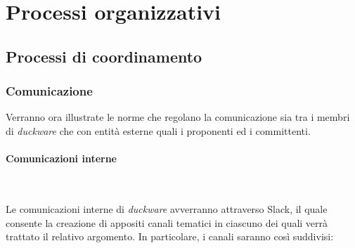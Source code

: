 \clearpage
\section{Processi organizzativi}
\label{sec:proc_org}
\subsection{Processi di coordinamento}
\label{sec:processi_coordinamento}
\subsubsection{Comunicazione}
Verranno ora illustrate le norme che regolano la comunicazione sia tra i membri di \emph{duckware} che con entità esterne quali i proponenti ed i committenti.

\paragraph{Comunicazioni interne}\mbox{}\\[0.4cm]
Le comunicazioni interne di \emph{duckware} avverranno attraverso Slack, il quale consente la creazione di appositi canali tematici in ciascuno dei quali verrà trattato il relativo argomento. In particolare, i canali saranno così suddivisi:
